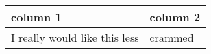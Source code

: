 \setlength{\tabcolsep}{0.5em} %
{\renewcommand{\arraystretch}{1.2}%
	\begin{tabular}{|l|l|}
		\hline
		column 1                      & column 2 \\
		\hline
		I really would like this less & crammed  \\
		\hline
	\end{tabular}
}
